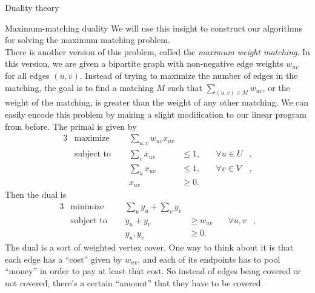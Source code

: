 \begin{section}{Duality theory}
\begin{subsection}{Maximum-matching duality}
	We will use this insight to construct our algorithms for solving the maximum matching problem. 
	\\
	There is another version of this problem, called the \emph{maximum weight matching}. In this 
	version, we are given a bipartite graph with non-negative edge weights $w_{uv}$ for all 
	edges $(u,v)$. Instead of trying to maximize the number of edges in the matching, the goal 
	is to find a matching $M$ such that $\sum_{(u,v) \in M} w_{uv}$, or the weight of the matching, 
	is greater than the weight of any other matching. We can easily encode this problem by making 
	a slight modification to our linear program from before. The primal is given by
	\begin{alignat}{3}
		& \text{maximize } & \sum_{u,v} w_{uv}x_{uv}& \\
		& \text{subject to } \quad & \sum_{v} x_{uv} & \leq 1, & \quad \forall u\in U&, \\
				     &\quad & \sum_{u} x_{uv} & \leq 1, & \quad \forall v\in V &, \\
				&& x_{uv} & \geq 0.
	\end{alignat}
	Then the dual is
	\begin{alignat}{3}
		& \text{minimize } & \sum_{u} y_u + \sum_v y_v& \\
		& \text{subject to } \quad & y_u + y_v & \geq w_{uv} & \quad \forall u,v &, \\
				    && y_u,y_v & \geq 0.
	\end{alignat}
	The dual is a sort of weighted vertex cover. One way to think about it is that each edge 
	has a ``cost'' given by $w_{uv}$, and each of its endpoints has to pool ``money'' in order 
	to pay at least that cost. So instead of edges being covered or not covered, there's a certain 
	``amount'' that they have to be covered.
\end{subsection}


\end{section}
